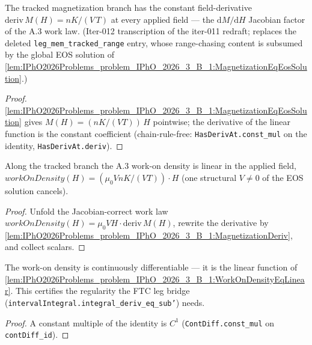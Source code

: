 \begin{lemma}
\label{lem:IPhO2026Problems_problem_IPhO_2026_3_B_1:MagnetizationDeriv}
The tracked magnetization branch has the constant field-derivative
$\mathrm{deriv}\,M(H) = nK/(V\,T)$ at every applied field --- the
$\mathrm{d}M/\mathrm{d}H$ Jacobian factor of the A.3 work law.
(Iter-012 transcription of the iter-011 redraft; replaces the deleted
\texttt{leg\_mem\_tracked\_range} entry, whose range-chasing content is
subsumed by the global EOS solution of
\cref{lem:IPhO2026Problems_problem_IPhO_2026_3_B_1:MagnetizationEqEosSolution}.)
\end{lemma}
\begin{proof}
\cref{lem:IPhO2026Problems_problem_IPhO_2026_3_B_1:MagnetizationEqEosSolution}
gives $M(H) = (nK/(VT))\,H$ pointwise; the derivative of the linear
function is the constant coefficient (chain-rule-free:
\texttt{HasDerivAt.const\_mul} on the identity, \texttt{HasDerivAt.deriv}).
\end{proof}

\begin{lemma}
\label{lem:IPhO2026Problems_problem_IPhO_2026_3_B_1:WorkOnDensityEqLinear}
Along the tracked branch the A.3 work-on density is linear in the applied
field, $\mathit{workOnDensity}(H) =
(\mu_0 V n K/(V T))\cdot H$ (one structural $V \neq 0$ of the EOS
solution cancels).
\end{lemma}
\begin{proof}
Unfold the Jacobian-correct work law
$\mathit{workOnDensity}(H) = \mu_0 V H \cdot \mathrm{deriv}\,M(H)$,
rewrite the derivative by
\cref{lem:IPhO2026Problems_problem_IPhO_2026_3_B_1:MagnetizationDeriv},
and collect scalars.
\end{proof}

\begin{lemma}
\label{lem:IPhO2026Problems_problem_IPhO_2026_3_B_1:WorkOnDensityContDiff}
The work-on density is continuously differentiable --- it is the linear
function of
\cref{lem:IPhO2026Problems_problem_IPhO_2026_3_B_1:WorkOnDensityEqLinear}.
This certifies the regularity the FTC leg bridge
(\texttt{intervalIntegral.integral\_deriv\_eq\_sub'}) needs.
\end{lemma}
\begin{proof}
A constant multiple of the identity is $C^1$
(\texttt{ContDiff.const\_mul} on \texttt{contDiff\_id}).
\end{proof}

